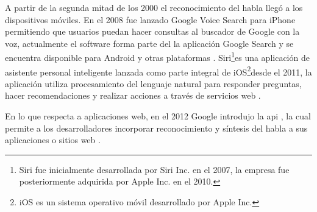 A partir de la segunda mitad de los 2000 el reconocimiento del habla lleg\'{o} a los dispositivos m\'{o}viles. 
En el 2008 fue lanzado Google Voice Search para iPhone permitiendo que usuarios puedan hacer consultas al 
buscador de Google con la voz, actualmente el software forma parte del la aplicaci\'{o}n Google Search y 
se encuentra disponible para Android y otras plataformas \cite{GoogleSearch}. 
Siri\footnote{Siri fue inicialmente desarrollada por Siri Inc. en el 2007, la empresa fue posteriormente 
adquirida por Apple Inc. en el 2010.}es una aplicaci\'{o}n de asistente personal inteligente lanzada como parte
integral de iOS\footnote{iOS es un sistema operativo m\'{o}vil desarrollado por Apple Inc.}desde el 2011, 
la aplicaci\'{o}n utiliza procesamiento del lenguaje natural para responder preguntas, hacer recomendaciones y
realizar acciones a trav\'{e}s de servicios web \cite{AppleSiri}.

En lo que respecta a aplicaciones web, en el 2012 Google introdujo la \gls{api} 
, la cual permite a los desarrolladores incorporar 
reconocimiento y s\'{i}ntesis del habla a sus aplicaciones o sitios web \cite{GoogleWebSpeechAPI}.
